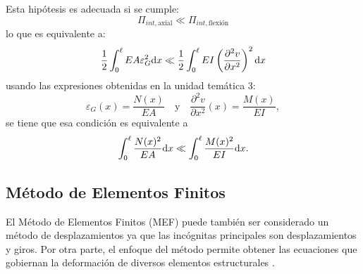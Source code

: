 Esta hipótesis es adecuada si se cumple:
%
\begin{equation}
\Pi_{int,\text{axial}} \ll \Pi_{int,\text{flexión}}
\end{equation}
%
lo que es equivalente a:%
%
\begin{equation}
\frac{1}{2} \int_{0}^{\ell} E A  \varepsilon_G^2 {\text{d}} x \ll \frac{1}{2} \int_{0}^{\ell} EI \left( \frac{\partial^2 v}{\partial x^2}\right)^2 {\text{d}} x
\end{equation}
usando las expresiones obtenidas en la unidad temática 3: 
\begin{equation}
\varepsilon_G(x) = \frac{	N (x) }{E A}
\quad
\text{y}
\quad
\frac{\partial^2 v}{\partial x^2}(x) = \frac{	M (x) }{E I} ,
\end{equation}
se tiene que esa condición es equivalente a 
%
\begin{equation}
\int_{0}^{\ell} \frac{	N (x)^2 }{E A} {\text{d}} x \ll \int_{0}^{\ell} \frac{	M (x)^2 }{E I}  {\text{d}} x.
\end{equation}

%



%



\subsection{Método de Elementos Finitos}

El Método de Elementos Finitos (MEF) puede también ser considerado un método de desplazamientos ya que las incógnitas principales son desplazamientos y giros. %
%
Por otra parte, el enfoque del método permite obtener las ecuaciones que gobiernan la deformación de diversos elementos estructurales \citep{Onate2013}.

